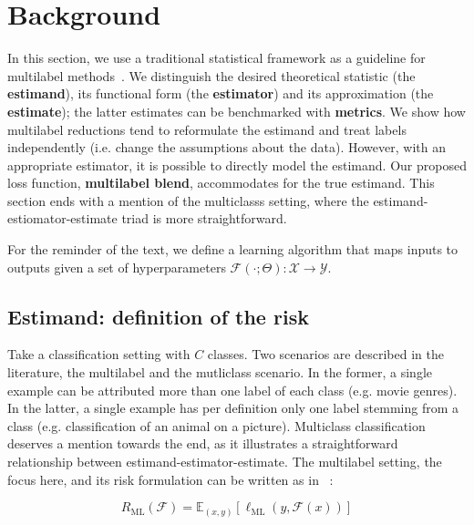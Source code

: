 
\section{Background}
\label{section:background}

In this section, we use a traditional statistical framework as a guideline for multilabel methods~\citep{tukey}. We distinguish the desired theoretical statistic (the \textbf{estimand}), its functional form (the \textbf{estimator}) and its approximation (the \textbf{estimate}); the latter estimates can be benchmarked with \textbf{metrics}. We show how multilabel reductions tend to reformulate the estimand and treat labels independently (i.e. change the assumptions about the data). However, with an appropriate estimator, it is possible to directly model the estimand. Our proposed loss function, \textbf{multilabel blend}, accommodates for the true estimand. This section ends with a mention of the multiclasss setting, where the estimand-estiomator-estimate triad is more straightforward.

For the reminder of the text, we define a learning algorithm that maps inputs to outputs given a set of hyperparameters \(\mathcal{F}(\cdot ; \Theta): \mathcal{X} \rightarrow \mathcal{Y}\). 

\subsection{Estimand: definition of the risk}
\label{section:background:estimand}

Take a classification setting with $C$ classes. Two scenarios are described in the literature, the multilabel and the mutliclass scenario. In the former, a single example can be attributed more than one label of each class (e.g. movie genres). In the latter, a single example has per definition only one label stemming from a class (e.g. classification of an animal on a picture). Multiclass classification deserves a mention towards the end, as it illustrates a straightforward relationship between estimand-estimator-estimate. The multilabel setting, the focus here, and its risk formulation can be written as in ~\citep{multilabelReduction}:

\begin{equation}
R_{\mathrm{ML}}(\mathcal{F}) = \mathbb{E}_{(x, y)}\left[\ell_{\mathrm{ML}}(y, \mathcal{F}(x))\right]
\end{equation}

